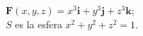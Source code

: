 \item $\mathbf{F}(x, y, z) = x^3\mathbf{i} + y^3\mathbf{j} + z^3\mathbf{k}$;\\
    $S$ es la esfera $x^2 + y^2 + z^2 = 1$.
